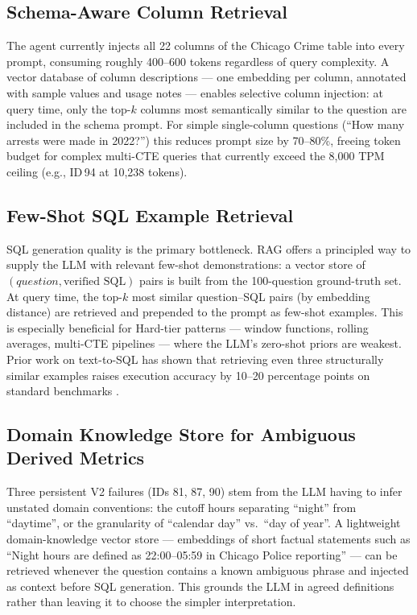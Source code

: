 \documentclass{article}
\begin{document}
\subsection{Schema-Aware Column Retrieval}

The agent currently injects all 22 columns of the Chicago Crime table into every prompt, consuming roughly 400--600 tokens regardless of query complexity. A vector database of column descriptions --- one embedding per column, annotated with sample values and usage notes --- enables selective column injection: at query time, only the top-$k$ columns most semantically similar to the question are included in the schema prompt. For simple single-column questions (``How many arrests were made in 2022?'') this reduces prompt size by 70--80\%, freeing token budget for complex multi-CTE queries that currently exceed the 8,000 TPM ceiling (e.g., ID\,94 at 10,238 tokens).

\subsection{Few-Shot SQL Example Retrieval}

SQL generation quality is the primary bottleneck. RAG offers a principled way to supply the LLM with relevant few-shot demonstrations: a vector store of $(question, \text{verified SQL})$ pairs is built from the 100-question ground-truth set. At query time, the top-$k$ most similar question--SQL pairs (by embedding distance) are retrieved and prepended to the prompt as few-shot examples. This is especially beneficial for Hard-tier patterns --- window functions, rolling averages, multi-CTE pipelines --- where the LLM's zero-shot priors are weakest. Prior work on text-to-SQL has shown that retrieving even three structurally similar examples raises execution accuracy by 10--20 percentage points on standard benchmarks \cite{guo2023prompting}.

\subsection{Domain Knowledge Store for Ambiguous Derived Metrics}

Three persistent V2 failures (IDs 81, 87, 90) stem from the LLM having to infer unstated domain conventions: the cutoff hours separating ``night'' from ``daytime'', or the granularity of ``calendar day'' vs.\ ``day of year''. A lightweight domain-knowledge vector store --- embeddings of short factual statements such as ``Night hours are defined as 22:00--05:59 in Chicago Police reporting'' --- can be retrieved whenever the question contains a known ambiguous phrase and injected as context before SQL generation. This grounds the LLM in agreed definitions rather than leaving it to choose the simpler interpretation.
\end{document}
